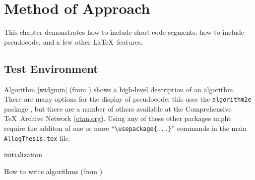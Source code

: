 %
%
%
\chapter{Method of Approach} \label{ch:method}
This chapter demonstrates how to include short code segments,
how to include pseudocode, and a few other \LaTeX\ features.

\section{Test Environment}
Algorithm \ref{widgmin} (from \cite{Fiori:2013}) shows a high-level description of an
algorithm. There are many options for the display of
pseudocode; this uses the {\tt algorithm2e} package \cite{Fiori:2013}, 
but there are a number of others available at the Comprehensive \TeX\ Archive
Network (\url{ctan.org}). Using any of these
other packages might require the additon of one or more
``\verb$\usepackage{...}$'' commands in the main {\tt AllegThesis.tex} file.


\begin{algorithm}[htbp]
 \SetAlgoLined %
 initialization\;
 \caption{How to write algorithms (from \cite{Fiori:2013})}
\label{widgmin}
\end{algorithm}

